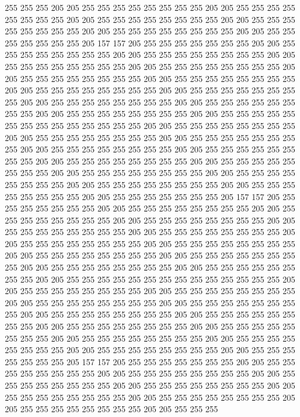 255 255 255 205 205 255 255 255 255 255 255 255 255 205 205 255 255 255 255 255
255 255 255 205 205 255 255 255 255 255 255 255 255 205 205 255 255 255 255 255
255 255 255 205 205 255 255 255 255 255 255 255 255 205 205 255 255 255 255 255
255 255 205 157 157 205 255 255 255 255 255 255 255 205 205 255 255 255 255 255
255 255 255 205 205 255 255 255 255 255 255 255 255 205 205 255 255 255 255 255
255 255 255 205 205 255 255 255 255 255 255 255 255 205 205 255 255 255 255 255
255 255 255 205 205 255 255 255 255 255 255 255 255 205 205 255 255 255 255 255
255 255 255 205 205 255 255 255 255 255 255 255 255 205 205 255 255 255 255 255
255 255 255 205 205 255 255 255 255 255 255 255 255 205 205 255 255 255 255 255
255 255 255 205 205 255 255 255 255 255 255 255 255 255 255 255 255 255 255 205
205 255 255 255 255 255 255 255 255 205 205 255 255 255 255 255 255 255 255 205
205 255 255 255 255 255 255 255 255 205 205 255 255 255 255 255 255 255 255 205
205 255 255 255 255 255 255 255 255 205 205 255 255 255 255 255 255 255 255 205
205 255 255 255 255 255 255 255 255 205 205 255 255 255 255 255 255 255 255 205
205 255 255 255 255 255 255 255 255 205 205 255 255 255 255 255 255 255 255 205
205 255 255 255 255 255 255 255 255 205 205 255 255 255 255 255 255 255 205 157
157 205 255 255 255 255 255 255 255 205 205 255 255 255 255 255 255 255 255 205
205 255 255 255 255 255 255 255 255 205 205 255 255 255 255 255 255 255 255 205
205 255 255 255 255 255 255 255 255 205 205 255 255 255 255 255 255 255 255 205
205 255 255 255 255 255 255 255 255 205 205 255 255 255 255 255 255 255 255 205
205 255 255 255 255 255 255 255 255 205 205 255 255 255 255 255 255 255 255 205
205 255 255 255 255 255 255 255 255 205 205 255 255 255 255 255 255 255 255 205
205 255 255 255 255 255 255 255 255 255 255 255 255 255 255 205 205 255 255 255
255 255 255 255 255 205 205 255 255 255 255 255 255 255 255 205 205 255 255 255
255 255 255 255 255 205 205 255 255 255 255 255 255 255 255 205 205 255 255 255
255 255 255 255 255 205 205 255 255 255 255 255 255 255 255 205 205 255 255 255
255 255 255 255 255 205 205 255 255 255 255 255 255 255 255 205 205 255 255 255
255 255 255 255 255 205 205 255 255 255 255 255 255 255 255 205 205 255 255 255
255 255 255 255 255 205 205 255 255 255 255 255 255 255 205 157 157 205 255 255
255 255 255 255 255 205 205 255 255 255 255 255 255 255 255 205 205 255 255 255
255 255 255 255 255 205 205 255 255 255 255 255 255 255 255 205 205 255 255 255
255 255 255 255 255 205 205 255 255 255 255 255 255 255 255 205 205 255 255 255
255 255 255 255 255 205 205 255 255 255 255 255 255 255 255 205 205 255 255 255
